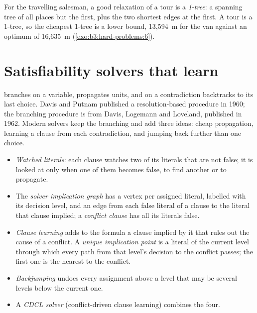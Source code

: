 \label{out:b3:hard-problems:knapsack}

For the travelling salesman, a good relaxation of a tour is a \emph{1-tree}: a spanning tree of all places but the first, plus the two shortest edges at the first. A tour is a 1-tree, so the cheapest 1-tree is a lower bound, 13,594~m for the van against an optimum of 16,635~m (\cref{exo:b3:hard-problems:6}).

\section{Satisfiability solvers that learn}\label{sec:b3:hard-problems:cdcl}

 branches on a variable, propagates units, and on a contradiction backtracks to its last choice. Davis and Putnam published a resolution-based procedure in 1960; the branching procedure is from Davis, Logemann and Loveland, published in 1962. %
Modern solvers keep the branching and add three ideas: cheap propagation, learning a clause from each contradiction, and jumping back further than one choice.

\begin{definition}\label{def:b3:hard-problems:cdcl}
\begin{itemize}
  \item \emph{Watched literals}: each clause watches two of its literals that are not false; it is looked at only when one of them becomes false, to find another or to propagate.
  \item The \emph{solver implication graph} has a vertex per assigned literal, labelled with its decision level, and an edge from each false literal of a clause to the literal that clause implied; a \emph{conflict clause} has all its literals false.
  \item \emph{Clause learning} adds to the formula a clause implied by it that rules out the cause of a conflict. A \emph{unique implication point} is a literal of the current level through which every path from that level's decision to the conflict passes; the first one is the nearest to the conflict.
  \item \emph{Backjumping} undoes every assignment above a level that may be several levels below the current one.
  \item A \emph{CDCL solver} (conflict-driven clause learning) combines the four.
\end{itemize}
\end{definition}

